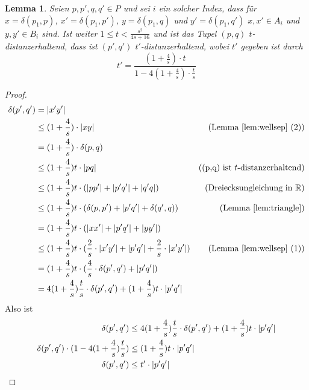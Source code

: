 \documentclass[11pt]{article}
\newcommand{\R}{\mathbb{R}}
\newtheorem{lemma}[theorem]{Lemma}
\begin{document}
    \begin{lemma}
    	\label{lem:stranget}
    	Seien $p, p', q, q' \in P$ und sei $i$ ein solcher Index, dass für $x = \delta(p_1, p)$, $x' = \delta(p_1, p')$, $y = \delta(p_1, q)$ und $y' = \delta(p_1, q')$ $x, x' \in A_i$ und $y, y' \in B_i$ sind. Ist weiter $1 \leq t < \frac{s^2}{4s + 16}$ und ist das Tupel $(p, q)$ $t$-distanzerhaltend, dass ist $(p', q')$ $t'$-distanzerhaltend, wobei $t'$ gegeben ist durch 
    	\[t' = \frac{(1+\frac{4}{s})\cdot t}{1 - 4(1 + \frac{4}{s})\cdot\frac{t}{s}}\]
    \end{lemma}
    \begin{proof}
    	\begin{align*}
	    	\delta(p', q') &= |x'y'| 
	    	\\ &\leq (1 + \frac{4}{s})\cdot|xy| & \text{(Lemma \ref{lem:wellsep} (2))}
	    	\\ &= (1 + \frac{4}{s})\cdot\delta(p, q)
	    	\\ &\leq (1 + \frac{4}{s})t\cdot |pq| & \text{((p,q) ist $t$-distanzerhaltend)}
	    	\\ &\leq (1 + \frac{4}{s})t\cdot (|pp'| + |p'q'| + |q'q|) & \text{(Dreiecksungleichung in $\R$)}
	    	\\ &\leq (1 + \frac{4}{s})t\cdot (\delta(p,p') + |p'q'| + \delta(q', q)) & \text{(Lemma \ref{lem:triangle})}
	    	\\ &= (1 + \frac{4}{s})t\cdot (|xx'| + |p'q'| + |yy'|)
	    	\\ &\leq (1 + \frac{4}{s})t\cdot (\frac{2}{s}\cdot|x'y'| + |p'q'| + \frac{2}{s}\cdot|x'y'|) & \text{(Lemma \ref{lem:wellsep} (1))}
	    	\\ &= (1 + \frac{4}{s})t\cdot (\frac{4}{s}\cdot\delta(p',q') + |p'q'|)
	    	\\ &= 4(1 + \frac{4}{s})\frac{t}{s}\cdot \delta(p',q') + (1 + \frac{4}{s})t\cdot|p'q'|
    	\end{align*}
    	Also ist
    	\begin{align*}
	    	\delta(p', q') &\leq 4(1 + \frac{4}{s})\frac{t}{s}\cdot \delta(p',q') + (1 + \frac{4}{s})t\cdot|p'q'|
	    	\\ \delta(p', q') \cdot (1 - 4(1 + \frac{4}{s})\frac{t}{s}) &\leq (1 + \frac{4}{s})t\cdot|p'q'| \tag*{\llap{\makebox[\linewidth][l]{$\Leftrightarrow$}}}
	    	\\ \delta(p',q') &\leq t' \cdot |p'q'| \tag*{\llap{\makebox[\linewidth][l]{$\Leftrightarrow$}}}
    	\end{align*}
    \end{proof}
    
\end{document}
